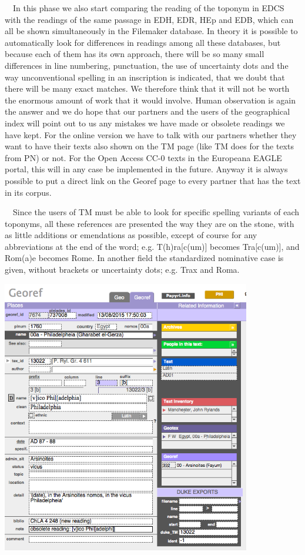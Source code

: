 \documentclass[amsthm,ebook]{saparticle}
\begin{document}
\bigskip

\ \ In this phase we also start comparing the reading of the toponym in EDCS with the readings of the same passage in
EDH, EDR, HEp and EDB, which can all be shown simultaneously in the Filemaker database. In theory it is possible to
automatically look for differences in readings among all these databases, but because each of them has its own
approach, there will be so many small differences in line numbering, punctuation, the use of uncertainty dots and the
way unconventional spelling in an inscription is indicated, that we doubt that there will be many exact matches. We
therefore think that it will not be worth the enormous amount of work that it would involve. Human observation is again
the answer and we do hope that our partners and the users of the geographical index will point out to us any mistakes
we have made or obsolete readings we have kept. For the online version we have to talk with our partners whether they
want to have their texts also shown on the TM page (like TM does for the texts from PN) or not. For the Open Access
CC-0 texts in the Europeana EAGLE portal, this will in any case be implemented in the future. Anyway it is always
possible to put a direct link on the Georef page to every partner that has the text in its corpus.

\ \ Since the users of TM must be able to look for specific spelling variants of each toponyms, all these references are
presented the way they are on the stone, with as little additions or emendations as possible, except of course for any
abbreviations at the end of the word; e.g. T(h)ra[c(um)] becomes Tra[c(um)], and Rom(a)e becomes Rome. In another field
the standardized nominative case is given, without brackets or uncertainty dots; e.g. Trax and Roma.


\bigskip

 \includegraphics[width=10.881cm,height=11.984cm]{EAGLE2016FullPaperVerreth-img003.png} 
\end{document}
